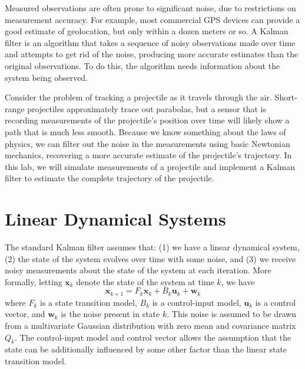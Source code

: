 
Measured observations are often prone to significant noise, due to restrictions on measurement accuracy.
For example, most commercial GPS devices can provide a good estimate of geolocation, but only within a dozen meters or so.
A Kalman filter is an algorithm that takes a sequence of noisy observations made over time and attempts to get rid of the noise, 
producing more accurate estimates than the original observations.
To do this, the algorithm needs information about the system being observed.

Consider the problem of tracking a projectile as it travels through the air. 
Short-range projectiles approximately trace out parabolas, but a sensor that is recording measurements of the projectile's position over time will likely show a path that is much
less smooth.
Because we know something about the laws of physics, we can filter out the noise in the measurements using basic Newtonian mechanics, recovering a more accurate estimate
of the projectile's trajectory.
In this lab, we will simulate measurements of a projectile and implement a Kalman filter to estimate the complete trajectory of the projectile.

\section*{Linear Dynamical Systems}
The standard Kalman filter assumes that:
(1) we have a linear dynamical system,
(2) the state of the system evolves over time with some noise, and 
(3) we receive noisy measurements about the state of the system at each iteration.
More formally, letting $\mathbf{x}_{k}$ denote the state of the system at time $k$, we have
\begin{equation}
\mathbf{x}_{k+1} = F_{k} \mathbf{x}_{k} + B_{k}\mathbf{u}_{k} + \mathbf{w}_{k}
\label{eq:state}
\end{equation}
where $F_{k}$ is a state transition model, $B_{k}$ is a control-input model, $\mathbf{u}_{k}$ is a control vector, and $\mathbf{w}_{k}$ is the noise present in state $k$.
This noise is assumed to be drawn from a multivariate Gaussian distribution with zero mean and covariance matrix $Q_{k}$.
The control-input model and control vector allows the assumption that the state can be additionally influenced by some other factor than the linear state transition model.

